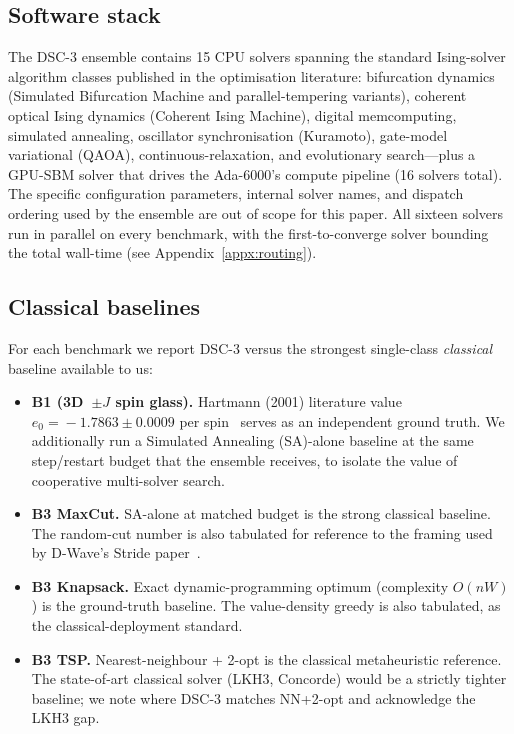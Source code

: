 \documentclass[11pt,a4paper]{article}
\begin{document}
\subsection{Software stack}

The DSC-3 ensemble contains 15 CPU solvers spanning the standard
Ising-solver algorithm classes published in the optimisation
literature: bifurcation dynamics (Simulated Bifurcation Machine and
parallel-tempering variants), coherent optical Ising dynamics
(Coherent Ising Machine), digital memcomputing, simulated annealing,
oscillator synchronisation (Kuramoto), gate-model variational
(QAOA), continuous-relaxation, and evolutionary search---plus a
GPU-SBM solver that drives the Ada-6000's compute pipeline (16
solvers total). The specific
configuration parameters, internal solver names, and dispatch
ordering used by the ensemble are out of scope for this paper. All
sixteen solvers run in parallel on every benchmark, with the
first-to-converge solver bounding the total wall-time (see
Appendix~\ref{appx:routing}).

\subsection{Classical baselines}

For each benchmark we report DSC-3 versus the strongest single-class
\emph{classical} baseline available to us:

\begin{itemize}\itemsep0.2em
\item[$\bullet$]\textbf{B1 (3D~$\pm J$ spin glass).} Hartmann (2001) literature
value $e_0\!=\!-1.7863\pm 0.0009$ per spin~\cite{hartmann_2001} serves as
an independent ground truth. We additionally run a Simulated Annealing
(SA)-alone baseline at the same step/restart budget that the ensemble
receives, to isolate the value of cooperative multi-solver search.
\item[$\bullet$]\textbf{B3 MaxCut.} SA-alone at matched budget is the strong
classical baseline. The random-cut number is also tabulated for reference
to the framing used by D-Wave's Stride paper~\cite{booth_stride_2024}.
\item[$\bullet$]\textbf{B3 Knapsack.} Exact dynamic-programming optimum
(complexity $O(nW)$) is the ground-truth baseline. The value-density
greedy is also tabulated, as the classical-deployment standard.
\item[$\bullet$]\textbf{B3 TSP.} Nearest-neighbour + 2-opt is the classical
metaheuristic reference. The state-of-art classical solver (LKH3,
Concorde) would be a strictly tighter baseline; we note where DSC-3
matches NN+2-opt and acknowledge the LKH3 gap.
\end{itemize}
\end{document}
